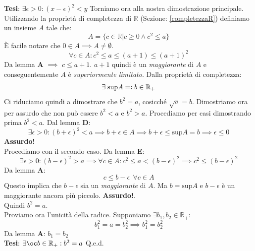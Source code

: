 {{        \textbf{Tesi}: $\exists \epsilon > 0: (x-\epsilon)^2 < y$
    }
    Torniamo ora alla nostra dimostrazione principale. Utilizzando la proprietà di completezza di $\mathbb{R}$ (Sezione: \ref{completezzaR}) definiamo un insieme $A$ tale che:
    \begin{equation*}
        A = \{c \in \mathbb{R} | c \geq 0 \land c^2 \leq a\}
    \end{equation*}
    È facile notare che $0 \in A \implies A \neq \emptyset$.
    \begin{equation*}
        \forall c\in A: c^2 \leq a \leq (a+1) \leq (a+1)^2
    \end{equation*}
    Da lemma \textbf{A} $\implies$ $c \leq a + 1$. $a + 1$ quindi è un \textit{maggiorante} di $A$ e conseguentemente $A$ è \textit{superiormente limitato}. Dalla proprietà di completezza:
    \begin{equation*}
        \exists\; \mathrm{sup}A = \vcentcolon b \in \mathbb{R}_{+} 
    \end{equation*}
    Ci riduciamo quindi a dimostrare che $b^2 = a$, cosicché $\sqrt{a} = b$. Dimostriamo ora per assurdo che non può essere $b^2 < a$ e $b^2 > a$. Procediamo per casi dimostrando prima $b^2 < a$. Dal lemma \textbf{D}:
    \begin{equation*}
        \exists \epsilon > 0: (b + \epsilon)^2 < a \implies b + \epsilon \in A \implies b + \epsilon \leq \mathrm{sup}A = b \implies \epsilon \leq 0
    \end{equation*}
    \textbf{Assurdo!}\\
    Procediamo con il secondo caso. Da lemma \textbf{E}:
    \begin{equation*}
        \exists \epsilon > 0 : (b-\epsilon)^2 > a \implies \forall c\in A: c^2 \leq a < (b-\epsilon)^2 \implies c^2 \leq (b-\epsilon)^2
    \end{equation*}
    Da lemma \textbf{A}:
    \begin{equation*}
        c \leq b - \epsilon\;\, \forall c \in A
    \end{equation*}
    Questo implica che $b-\epsilon$ sia un \textit{maggiorante} di $A$. Ma $b=\mathrm{sup}A$ e $b-\epsilon$ è un maggiorante ancora più piccolo. \textbf{Assurdo!}.\\
    
    Quindi $b^2 = a$.\\
    
    Proviamo ora l'unicità della radice. Supponiamo $\exists b_1, b_2 \in \mathbb{R}_{+}$:
    \begin{equation*}
        b_{1}^2 = a = b_{2}^2 \implies b_{1}^2=b_{2}^2
    \end{equation*}
    Da lemma \textbf{A}: $b_1 = b_2$\\
    
    \textbf{Tesi}: $\exists \oc b \in \mathbb{R}_{+} : b^2 = a$
    \hfill Q.e.d.
}
